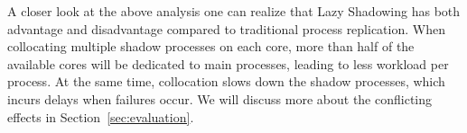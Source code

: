 A closer look at the above analysis one can realize that Lazy Shadowing has both advantage and disadvantage compared to traditional process replication. When collocating multiple shadow processes on each core, more than half of the available cores will be dedicated to main processes, leading to less workload per process. At the same time, collocation slows down the shadow processes, which incurs delays when failures occur. We will discuss more about the conflicting effects in Section~\ref{sec:evaluation}.







